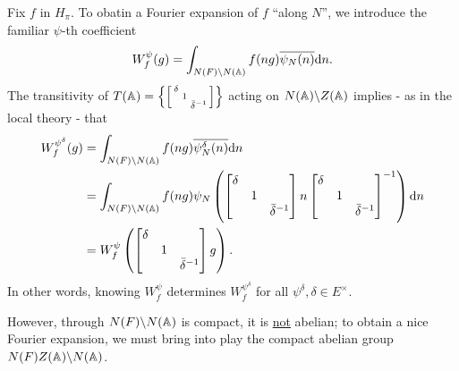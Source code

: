 Fix $f$ in $H_\pi$.
To obatin a Fourier expansion of $f$ ``along $N$'', we introduce the familiar $\psi$-th coefficient
\[
    W_f^\psi(g) = \int_{N(F) \backslash N(\mathbb{A})} f(ng) \overline{\psi_N(n)} \mathrm{d} n.
\]
The transitivity of $T(\mathbb{A}) = \left\{\left[\begin{smallmatrix}\delta & & \\ & 1 & \\ & & \bar\delta^{-1}\end{smallmatrix}\right]\right\}$ acting on $N(\mathbb{A}) \backslash Z(\mathbb{A})$ implies - as in the local theory - that
\begin{align*}
    W_f^{\psi^\delta}(g) &= \int_{N(F) \backslash N(\mathbb{A})} f(ng) \overline{\psi_N^\delta(n)} \mathrm{d} n \\
    &= \int_{N(F) \backslash N(\mathbb{A})} f(ng) \psi_N \left(\begin{bmatrix}
        \delta & & \\ & 1 & \\ & & \bar{\delta}^{-1}
    \end{bmatrix} n\begin{bmatrix}
        \delta & & \\ & 1 & \\ & & \bar{\delta}^{-1}
    \end{bmatrix}^{-1}\right) \mathrm{d} n \\
    &= W_f^{\psi} \left(\begin{bmatrix}
        \delta & & \\ & 1&  \\ & & \bar{\delta}^{-1}
    \end{bmatrix}g\right).
\end{align*}
In other words, knowing $W_f^\psi$ determines $W_f^{\psi^\delta}$ for all $\psi^\delta, \delta \in E^\times$.

However, through $N(F) \backslash N(\mathbb{A})$ is compact, it is \underline{not} abelian; to obtain a nice Fourier expansion, we must bring into play the compact abelian group $N(F) Z(\mathbb{A}) \backslash N(\mathbb{A})$.


\subsection{}
\label{sec:2.2}
